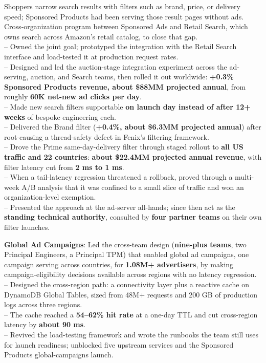 \documentclass[letterpaper,11pt]{article}
\newcommand{\resumeItem}[2]{
  \item\small{
    \textbf{#1}{: #2\vspace{-2pt}}
  }
}
\begin{document}
          {Shoppers narrow search results with filters such as brand, price, or delivery speed; Sponsored Products had been serving those result pages without ads. Cross-organization program between Sponsored Ads and Retail Search, which owns search across Amazon's retail catalog, to close that gap.\\
          -- Owned the joint goal; prototyped the integration with the Retail Search interface and load-tested it at production request rates.\\
          -- Designed and led the auction-stage integration experiment across the ad-serving, auction, and Search teams, then rolled it out worldwide: \textbf{+0.3\% Sponsored Products revenue, about \$88MM projected annual}, from roughly \textbf{60K net-new ad clicks per day}.\\
          -- Made new search filters supportable \textbf{on launch day instead of after 12+ weeks} of bespoke engineering each.\\
          -- Delivered the Brand filter (\textbf{+0.4\%, about \$6.3MM projected annual}) after root-causing a thread-safety defect in Fenix's filtering framework.\\
          -- Drove the Prime same-day-delivery filter through staged rollout to \textbf{all US traffic and 22 countries}: \textbf{about \$22.4MM projected annual revenue}, with filter latency cut from \textbf{2 ms to 1 ms}.\\
          -- When a tail-latency regression threatened a rollback, proved through a multi-week A/B analysis that it was confined to a small slice of traffic and won an organization-level exemption.\\
          -- Presented the approach at the ad-server all-hands; since then act as the \textbf{standing technical authority}, consulted by \textbf{four partner teams} on their own filter launches.}
		\pagebreak
		\resumeItem{Global Ad Campaigns}
          {Led the cross-team design (\textbf{nine-plus teams}, two Principal Engineers, a Principal TPM) that enabled global ad campaigns, one campaign serving across countries, for \textbf{1.08M+ advertisers}, by making campaign-eligibility decisions available across regions with no latency regression.\\
          -- Designed the cross-region path: a connectivity layer plus a reactive cache on DynamoDB Global Tables, sized from 48M+ requests and 200 GB of production logs across three regions.\\
          -- The cache reached a \textbf{54--62\% hit rate} at a one-day TTL and cut cross-region latency by \textbf{about 90 ms}.\\
          -- Revived the load-testing framework and wrote the runbooks the team still uses for launch readiness; unblocked five upstream services and the Sponsored Products global-campaigns launch.}
\end{document}
